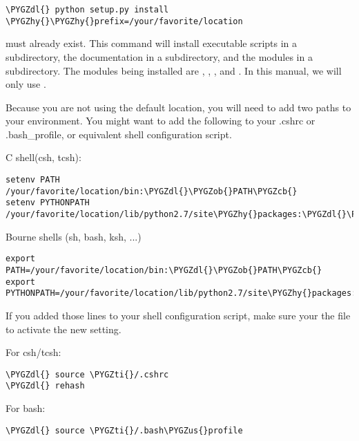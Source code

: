 \documentclass[letterpaper,10pt,english]{sphinxmanual}
\def\PYGZus{\char`\_}
\def\PYGZob{\char`\{}
\def\PYGZcb{\char`\}}
\def\PYGZdl{\char`\$}
\def\PYGZhy{\char`\-}
\def\PYGZti{\char`\~}
\begin{document}
\begin{Verbatim}[commandchars=\\\{\}]
\PYGZdl{} python setup.py install \PYGZhy{}\PYGZhy{}prefix=/your/favorite/location
\end{Verbatim}

 must already exist.  This command will install executable
scripts in a  subdirectory, the documentation in a  subdirectory,
and the modules in a  subdirectory.  The modules being
installed are , , , and .
In this manual, we will only use .

Because you are not using the default location, you will need to add two paths to
your environment.  You might want to add the following to your .cshrc or
.bash\_profile, or equivalent shell configuration script.

C shell(csh, tcsh):

\begin{Verbatim}[commandchars=\\\{\}]
setenv PATH /your/favorite/location/bin:\PYGZdl{}\PYGZob{}PATH\PYGZcb{}
setenv PYTHONPATH /your/favorite/location/lib/python2.7/site\PYGZhy{}packages:\PYGZdl{}\PYGZob{}PYTHONPATH\PYGZcb{}
\end{Verbatim}

Bourne shells (sh, bash, ksh, ...)

\begin{Verbatim}[commandchars=\\\{\}]
export PATH=/your/favorite/location/bin:\PYGZdl{}\PYGZob{}PATH\PYGZcb{}
export PYTHONPATH=/your/favorite/location/lib/python2.7/site\PYGZhy{}packages:\PYGZdl{}\PYGZob{}PYTHONPATH\PYGZcb{}
\end{Verbatim}

If you added those lines to your shell configuration script, make sure your
 the file to activate the new setting.

For csh/tcsh:

\begin{Verbatim}[commandchars=\\\{\}]
\PYGZdl{} source \PYGZti{}/.cshrc
\PYGZdl{} rehash
\end{Verbatim}

For bash:

\begin{Verbatim}[commandchars=\\\{\}]
\PYGZdl{} source \PYGZti{}/.bash\PYGZus{}profile
\end{Verbatim}
\end{document}
